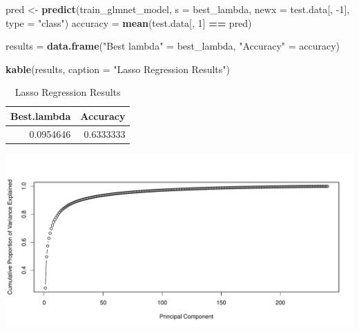 \documentclass[]{article}
\newenvironment{Shaded}{\begin{snugshade}}{\end{snugshade}}
\newcommand{\DataTypeTok}[1]{\textcolor[rgb]{0.13,0.29,0.53}{#1}}
\newcommand{\DecValTok}[1]{\textcolor[rgb]{0.00,0.00,0.81}{#1}}
\newcommand{\KeywordTok}[1]{\textcolor[rgb]{0.13,0.29,0.53}{\textbf{#1}}}
\newcommand{\NormalTok}[1]{#1}
\newcommand{\OperatorTok}[1]{\textcolor[rgb]{0.81,0.36,0.00}{\textbf{#1}}}
\newcommand{\StringTok}[1]{\textcolor[rgb]{0.31,0.60,0.02}{#1}}
\begin{document}
\begin{Shaded}
\begin{Highlighting}[]
\NormalTok{  pred <-}\StringTok{ }\KeywordTok{predict}\NormalTok{(train_glmnet_model, }\DataTypeTok{s =}\NormalTok{ best_lambda, }\DataTypeTok{newx =}\NormalTok{ test.data[, }\DecValTok{-1}\NormalTok{], }\DataTypeTok{type =} \StringTok{"class"}\NormalTok{)}
\NormalTok{  accuracy =}\StringTok{ }\KeywordTok{mean}\NormalTok{(test.data[, }\DecValTok{1}\NormalTok{] }\OperatorTok{==}\StringTok{ }\NormalTok{pred)}
  
\NormalTok{  results =}\StringTok{ }\KeywordTok{data.frame}\NormalTok{(}\StringTok{"Best lambda"}\NormalTok{ =}\StringTok{ }\NormalTok{best_lambda, }\StringTok{"Accuracy"}\NormalTok{ =}\StringTok{ }\NormalTok{accuracy)}
\end{Highlighting}
\end{Shaded}

\begin{Shaded}
\begin{Highlighting}[]
  \KeywordTok{kable}\NormalTok{(results, }\DataTypeTok{caption =} \StringTok{"Lasso Regression Results"}\NormalTok{)}
\end{Highlighting}
\end{Shaded}

\begin{table}

\caption{\label{tab:unnamed-chunk-13}Lasso Regression Results}
\centering
\begin{tabular}[t]{r|r}
\hline
Best.lambda & Accuracy\\
\hline
0.0954646 & 0.6333333\\
\hline
\end{tabular}
\end{table}

\begin{center}\includegraphics[width=1\linewidth]{Project2_as81_files/figure-latex/unnamed-chunk-16-1} \end{center}
\end{document}

